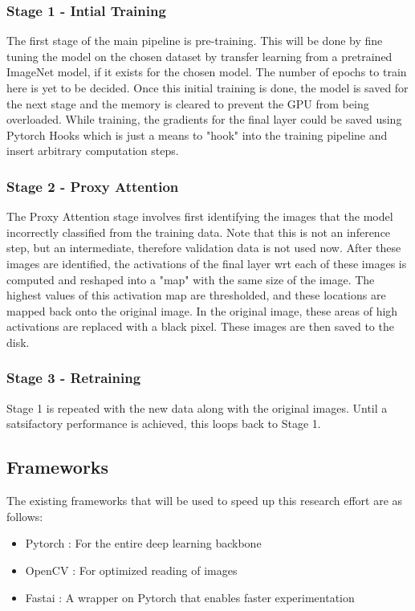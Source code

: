 \subsubsection*{Stage 1 - Intial Training}
The first stage of the main pipeline is pre-training. This will be done by fine tuning the model on the chosen dataset by transfer learning from a pretrained ImageNet model, if it exists for the chosen model. The number of epochs to train here is yet to be decided. Once this initial training is done, the model is saved for the next stage and the memory is cleared to prevent the GPU from being overloaded.
While training, the gradients for the final layer could be saved using Pytorch Hooks which is just a means to "hook" into the training pipeline and insert arbitrary computation steps.

\subsubsection*{Stage 2 - Proxy Attention}
The Proxy Attention stage involves first identifying the images that the model incorrectly classified from the training data. Note that this is not an inference step, but an intermediate, therefore validation data is not used now. After these images are identified, the activations of the final layer wrt each of these images is computed and reshaped into a "map" with the same size of the image. The highest values of this activation map are thresholded, and these locations are mapped back onto the original image. In the original image, these areas of high activations are replaced with a black pixel. These images are then saved to the disk.

\subsubsection*{Stage 3 - Retraining}
Stage 1 is repeated with the new data along with the original images. Until a satsifactory performance is achieved, this loops back to Stage 1.

\subsection{Frameworks}
The existing frameworks that will be used to speed up this research effort are as follows: 
\begin{itemize}
\item Pytorch \cite{paszke2019pytorch}: For the entire deep learning backbone
\item OpenCV \cite{bradski2000opencv}: For optimized reading of images
\item Fastai \cite{howard2018fastai}: A wrapper on Pytorch that enables faster experimentation 
\end{itemize}

